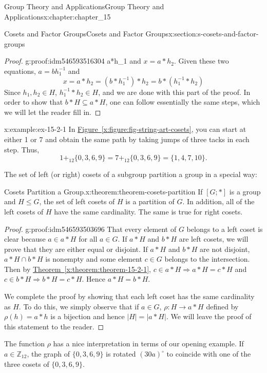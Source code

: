 \documentclass[oneside,10pt,]{book}
\newcommand{\xreffont}{\relax}
\numberwithin{equation}{section}
\begin{document}
\begin{chapterptx}{Group Theory and Applications}{}{Group Theory and Applications}{}{}{x:chapter:chapter_15}
\begin{sectionptx}{Cosets and Factor Groups}{}{Cosets and Factor Groups}{}{}{x:section:s-cosets-and-factor-groups}
\begin{proof}{}{g:proof:idm546593516304}
a*h_1\) and \(x = a*h_2\). Given these two equations, \(a = b h_1^{-1}\) and%
\begin{equation*}
x = a*h_2 = (b *h_1^{-1})*h_2 = b*(h_1^{-1}*h_2)
\end{equation*}
Since \(h_1,h_2 \in H\),   \(h_1^{-1}*h_2 \in H\), and we are done with this part of the proof.  In order to show that \(b*H \subseteq a*H\), one can follow essentially the same steps, which we will let the reader fill in.%
\end{proof}
\begin{example}{}{x:example:ex-15-2-1}%
In \hyperref[x:figure:fig-string-art-cosets]{Figure~{\xreffont\ref{x:figure:fig-string-art-cosets}}}, you can start at either 1 or 7 and obtain the same path by taking jumps of three tacks in each step. Thus,%
\begin{equation*}
1+_{12} \{0, 3, 6, 9\} = 7 +_{12} \{0, 3, 6, 9\} = \{1, 4, 7, 10\}.
\end{equation*}
%
\end{example}
The set of left (or right) cosets of a subgroup partition a group in a special way:%
\begin{theorem}{Cosets Partition a Group.}{}{x:theorem:theorem-cosets-partition}%
%
If \([G; *]\) is a group and \(H\leq  G\), the set of left cosets of \(H\) is a partition of \(G\). In addition, all of the left cosets of \(H\) have the same cardinality. The same is true for right cosets.%
\end{theorem}
\begin{proof}{}{g:proof:idm546593503696}
That every element of \(G\) belongs to a left coset is clear because \(a \in  a*H\) for all \(a \in  G\). If \(a*H\) and \(b*H\) are left cosets, we will prove that they are either equal or disjoint. If \(a*H\) and \(b*H\) are not disjoint, \(a*H\cap b*H\) is nonempty and some element \(c \in G\) belongs to the intersection. Then by \hyperref[x:theorem:theorem-15-2-1]{Theorem~{\xreffont\ref{x:theorem:theorem-15-2-1}}}, \(c\in a*H \Rightarrow  a*H = c*H\) and \(c \in b*H \Rightarrow  b*H = c*H\). Hence  \(a*H = b*H\).%
\par
We complete the proof by showing that each left coset has the same cardinality as \(H\). To do this, we simply observe that if \(a \in  G\), \(\rho:H \to  a*H\) defined by \(\rho(h)= a*h\) is a bijection and hence \(\lvert H\rvert =\lvert a *H\rvert\).  We will leave the proof of this statement to the reader.%
\end{proof}
The function \(\rho\) has a nice interpretation in terms of our opening example.  If \(a \in  \mathbb{Z}_{12}\), the graph of \(\{0, 3, 6, 9\}\) is rotated \((30a)^{\circ}\) to coincide with one of the three cosets of \(\{0, 3, 6, 9\}\).%

\end{sectionptx}
\end{chapterptx}
\end{document}
